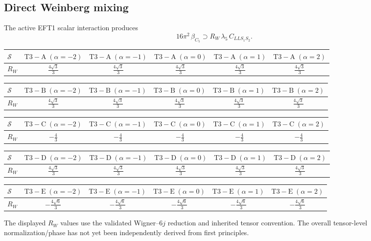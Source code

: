 \documentclass[9pt]{article}
\begin{document}
\subsection*{Direct Weinberg mixing}
The active EFT1 scalar interaction produces
\[16\pi^2\,\beta_{C_5}\supset R_W\,\lambda_5\,C_{LLS_1S_2}.\]
\begin{longtable}{@{}lccccc@{}}
\toprule
$\mathcal{S}$ & $ \mathrm{T3-A}\;(\alpha=-2) $ & $ \mathrm{T3-A}\;(\alpha=-1) $ & $ \mathrm{T3-A}\;(\alpha=0) $ & $ \mathrm{T3-A}\;(\alpha=1) $ & $ \mathrm{T3-A}\;(\alpha=2) $ \\
\midrule
$R_W$ & $ \frac{4 \sqrt{3}}{3} $ & $ \frac{4 \sqrt{3}}{3} $ & $ \frac{4 \sqrt{3}}{3} $ & $ \frac{4 \sqrt{3}}{3} $ & $ \frac{4 \sqrt{3}}{3} $ \\
\bottomrule
\end{longtable}
\begin{longtable}{@{}lccccc@{}}
\toprule
$\mathcal{S}$ & $ \mathrm{T3-B}\;(\alpha=-2) $ & $ \mathrm{T3-B}\;(\alpha=-1) $ & $ \mathrm{T3-B}\;(\alpha=0) $ & $ \mathrm{T3-B}\;(\alpha=1) $ & $ \mathrm{T3-B}\;(\alpha=2) $ \\
\midrule
$R_W$ & $ \frac{4 \sqrt{3}}{3} $ & $ \frac{4 \sqrt{3}}{3} $ & $ \frac{4 \sqrt{3}}{3} $ & $ \frac{4 \sqrt{3}}{3} $ & $ \frac{4 \sqrt{3}}{3} $ \\
\bottomrule
\end{longtable}
\begin{longtable}{@{}lccccc@{}}
\toprule
$\mathcal{S}$ & $ \mathrm{T3-C}\;(\alpha=-2) $ & $ \mathrm{T3-C}\;(\alpha=-1) $ & $ \mathrm{T3-C}\;(\alpha=0) $ & $ \mathrm{T3-C}\;(\alpha=1) $ & $ \mathrm{T3-C}\;(\alpha=2) $ \\
\midrule
$R_W$ & $ - \frac{4}{3} $ & $ - \frac{4}{3} $ & $ - \frac{4}{3} $ & $ - \frac{4}{3} $ & $ - \frac{4}{3} $ \\
\bottomrule
\end{longtable}
\begin{longtable}{@{}lccccc@{}}
\toprule
$\mathcal{S}$ & $ \mathrm{T3-D}\;(\alpha=-2) $ & $ \mathrm{T3-D}\;(\alpha=-1) $ & $ \mathrm{T3-D}\;(\alpha=0) $ & $ \mathrm{T3-D}\;(\alpha=1) $ & $ \mathrm{T3-D}\;(\alpha=2) $ \\
\midrule
$R_W$ & $ \frac{4 \sqrt{3}}{3} $ & $ \frac{4 \sqrt{3}}{3} $ & $ \frac{4 \sqrt{3}}{3} $ & $ \frac{4 \sqrt{3}}{3} $ & $ \frac{4 \sqrt{3}}{3} $ \\
\bottomrule
\end{longtable}
\begin{longtable}{@{}lccccc@{}}
\toprule
$\mathcal{S}$ & $ \mathrm{T3-E}\;(\alpha=-2) $ & $ \mathrm{T3-E}\;(\alpha=-1) $ & $ \mathrm{T3-E}\;(\alpha=0) $ & $ \mathrm{T3-E}\;(\alpha=1) $ & $ \mathrm{T3-E}\;(\alpha=2) $ \\
\midrule
$R_W$ & $ - \frac{4 \sqrt{6}}{3} $ & $ - \frac{4 \sqrt{6}}{3} $ & $ - \frac{4 \sqrt{6}}{3} $ & $ - \frac{4 \sqrt{6}}{3} $ & $ - \frac{4 \sqrt{6}}{3} $ \\
\bottomrule
\end{longtable}
The displayed $R_W$ values use the validated Wigner--$6j$ reduction and inherited tensor convention.  The overall tensor-level normalization/phase has not yet been independently derived from first principles.
\end{document}
